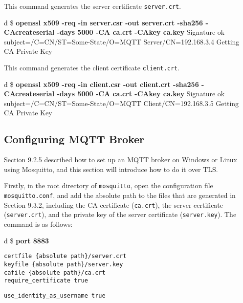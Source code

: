 \documentclass[a4paper,12pt]{book}
\begin{document}
\vspace{6pt}
This command generates the server certificate \verb|server.crt|.

\begin{codebloc}
\begin{tabular}{d}
\$ \textbf{openssl x509 -req -in server.csr -out server.crt -sha256 -CAcreateserial -days 5000 -CA ca.crt -CAkey ca.key}\newline
Signature ok\newline
subject=/C=CN/ST=Some-State/O=MQTT Server/CN=192.168.3.4\newline
Getting CA Private Key
\end{tabular}
\end{codebloc}

\vspace{6pt}
This command generates the client certificate \verb|client.crt|.

\begin{codebloc}
\begin{tabular}{d}
\$ \textbf{openssl x509 -req -in client.csr -out client.crt -sha256 -CAcreateserial -days 5000 -CA ca.crt -CAkey ca.key}\newline
Signature ok\newline
subject=/C=CN/ST=Some-State/O=MQTT Client/CN=192.168.3.5\newline
Getting CA Private Key
\end{tabular}
\end{codebloc}


\subsection{Configuring MQTT Broker}
Section 9.2.5 described how to set up an MQTT broker on Windows or Linux using Mosquitto, and this section will introduce how to do it over TLS.

Firstly, in the root directory of \verb|mosquitto|, open the configuration file \verb|mosquitto.conf|, and add the absolute path to the files that are generated in Section 9.3.2, including the CA certificate (\verb|ca.crt|), the server certificate (\verb|server.crt|), and the private key of the server certificate (\verb|server.key|). The command is as follows:

\begin{codebloc}
\begin{tabular}{d}
\$ \textbf{port 8883}
\begin{verbatim}
certfile {absolute path}/server.crt
keyfile {absolute path}/server.key
cafile {absolute path}/ca.crt
require_certificate true
\end{verbatim}
\verb|use_identity_as_username true|
\end{tabular}
\end{codebloc}
\end{document}
